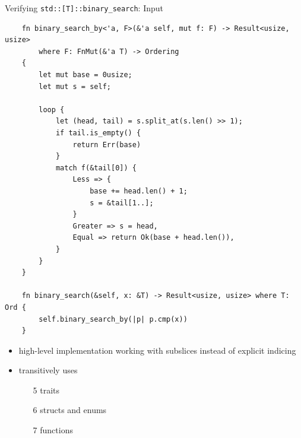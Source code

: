 \documentclass{beamer}
\begin{document}
\begin{frame}[fragile]{Verifying \texttt{std::[T]::binary\_search}: Input}
  \begin{verbatim}
    fn binary_search_by<'a, F>(&'a self, mut f: F) -> Result<usize, usize>
        where F: FnMut(&'a T) -> Ordering
    {
        let mut base = 0usize;
        let mut s = self;

        loop {
            let (head, tail) = s.split_at(s.len() >> 1);
            if tail.is_empty() {
                return Err(base)
            }
            match f(&tail[0]) {
                Less => {
                    base += head.len() + 1;
                    s = &tail[1..];
                }
                Greater => s = head,
                Equal => return Ok(base + head.len()),
            }
        }
    }

    fn binary_search(&self, x: &T) -> Result<usize, usize> where T: Ord {
        self.binary_search_by(|p| p.cmp(x))
    }
  \end{verbatim}

  \begin{itemize}
    \item high-level implementation working with subslices instead of explicit indicing
    \item transitively uses
      \begin{itemize}
        \item[5] traits
        \item[6] structs and enums
        \item[7] functions
      \end{itemize}
  \end{itemize}
\end{frame}
\end{document}
